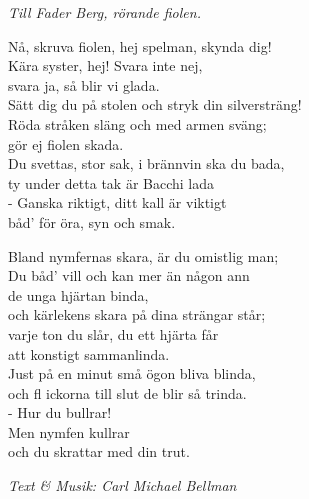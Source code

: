 {\footnotesize\textit{Till Fader Berg, rörande fiolen.}}\par
\vspace{10pt}
Nå, skruva fiolen, hej spelman, skynda dig!\\
Kära syster, hej! Svara inte nej,\\
svara ja, så blir vi glada.\\
Sätt dig du på stolen och stryk din silversträng!\\
Röda stråken släng och med armen sväng;\\
gör ej fiolen skada.\\
Du svettas, stor sak, i brännvin ska du bada,\\
ty under detta tak är Bacchi lada\\
- Ganska riktigt, ditt kall är viktigt\\
båd' för öra, syn och smak.\par
\vspace{10pt}
Bland nymfernas skara, är du omistlig man;\\
Du båd’ vill och kan mer än någon ann\\
de unga hjärtan binda,\\
och kärlekens skara på dina strängar står;\\
varje ton du slår, du ett hjärta får\\
att konstigt sammanlinda.\\
Just på en minut små ögon bliva blinda,\\
och fl ickorna till slut de blir så trinda.\\
- Hur du bullrar!\\
Men nymfen kullrar\\
och du skrattar med din trut.\par
\vspace{10pt}
{\footnotesize\textit{Text \& Musik: Carl Michael Bellman}}
